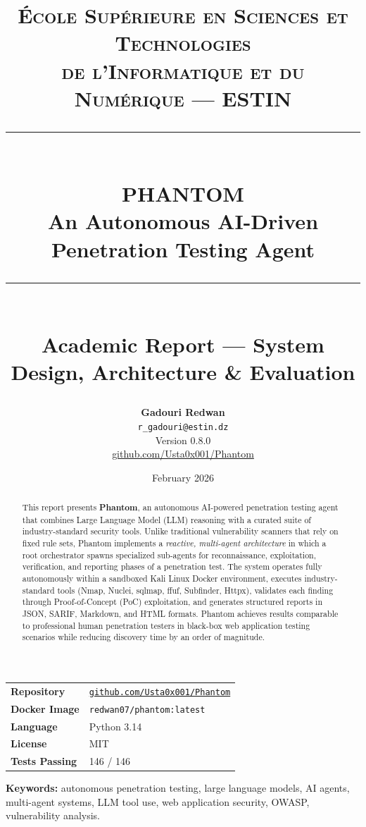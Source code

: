 \documentclass[12pt,a4paper]{article}
\title{
  \vspace{-1cm}
  {\large \textsc{École Supérieure en Sciences et Technologies}\\
  \textsc{de l'Informatique et du Numérique --- ESTIN}}\\[0.5cm]
  \rule{\linewidth}{1.5pt}\\[0.4cm]
  {\LARGE \textbf{\textcolor{phantomred}{PHANTOM}}}\\[0.3cm]
  {\Large An Autonomous AI-Driven Penetration Testing Agent}\\[0.4cm]
  \rule{\linewidth}{1.5pt}\\[0.5cm]
  {\normalsize Academic Report --- System Design, Architecture \& Evaluation}
}
\author{
  \textbf{Gadouri Redwan}\\
  \texttt{r\_gadouri@estin.dz}\\[0.5cm]
  Version 0.8.0\\
  \href{https://github.com/Usta0x001/Phantom}{github.com/Usta0x001/Phantom}
}
\date{February 2026}
\begin{document}

\maketitle
\thispagestyle{empty}

\vspace{1cm}
\begin{center}
\begin{tabular}{ll}
\toprule
\textbf{Repository} & \href{https://github.com/Usta0x001/Phantom}{\texttt{github.com/Usta0x001/Phantom}} \\
\textbf{Docker Image} & \texttt{redwan07/phantom:latest} \\
\textbf{Language} & Python 3.14 \\
\textbf{License} & MIT \\
\textbf{Tests Passing} & 146 / 146 \\
\bottomrule
\end{tabular}
\end{center}

\newpage
\tableofcontents
\newpage

\begin{abstract}
\noindent
This report presents \textbf{Phantom}, an autonomous AI-powered penetration testing agent that combines Large Language Model (LLM) reasoning with a curated suite of industry-standard security tools. Unlike traditional vulnerability scanners that rely on fixed rule sets, Phantom implements a \emph{reactive, multi-agent architecture} in which a root orchestrator spawns specialized sub-agents for reconnaissance, exploitation, verification, and reporting phases of a penetration test. The system operates fully autonomously within a sandboxed Kali Linux Docker environment, executes industry-standard tools (Nmap, Nuclei, sqlmap, ffuf, Subfinder, Httpx), validates each finding through Proof-of-Concept (PoC) exploitation, and generates structured reports in JSON, SARIF, Markdown, and HTML formats. Phantom achieves results comparable to professional human penetration testers in black-box web application testing scenarios while reducing discovery time by an order of magnitude.
\end{abstract}

\vspace{0.5cm}
\noindent\textbf{Keywords:} autonomous penetration testing, large language models, AI agents, multi-agent systems, LLM tool use, web application security, OWASP, vulnerability analysis.
\end{document}
